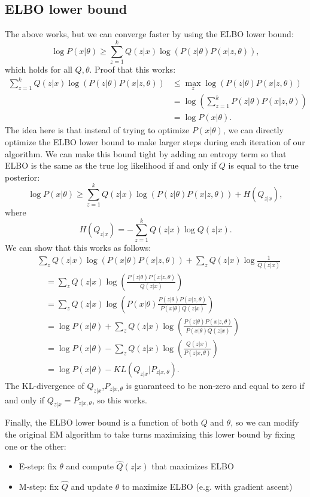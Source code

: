 \subsection{ELBO lower bound}

The above works, but we can converge faster by using the ELBO lower bound: 
\[\log P(x|\theta) \geq \sum_{z=1}^k Q(z|x)\log \left(P(z|\theta)P(x|z,\theta)\right),\]
which holds for all $Q,\theta$. Proof that this works: 
\begin{align*}
	\sum_{z=1}^k Q(z|x)\log \left(P(z|\theta)P(x|z,\theta)\right) &\leq \max_z \log \left(P(z|\theta)P(x|z,\theta)\right) \\
																																&= \log \left(\sum_{z=1}^k P(z|\theta) P(x|z,\theta)\right) \\
																																&= \log P(x|\theta). 
\end{align*}
The idea here is that instead of trying to optimize $P(x|\theta)$, we can directly optimize the ELBO lower bound to make larger steps during each iteration of our algorithm. We can make this bound tight by adding an entropy term so that ELBO is the same as the true log likelihood if and only if $Q$ is equal to the true posterior: 
\[\log P(x|\theta) \geq \sum_{z=1}^k Q(z|x)\log \left(P(z|\theta)P(x|z,\theta)\right) + H(Q_{z|x}), \]
where 
\[H(Q_{z|x}) = -\sum_{z=1}^kQ(z|x)\log Q(z|x).\]
We can show that this works as follows: 
\begin{align*}
	&\sum_z Q(z|x)\log \left(P(x|\theta)P(x|z,\theta)\right) + \sum_z Q(z|x) \log \frac{1}{Q(z|x)} \\
	&\quad = \sum_z Q(z|x)\log \left(\frac{P(z|\theta)P(x|z,\theta)}{Q(z|x)}\right) \\
	&\quad = \sum_z Q(z|x)\log \left(P(x|\theta) \frac{P(z|\theta)P(x|z,\theta)}{P(x|\theta)Q(z|x)}\right) \\
	&\quad = \log P(x|\theta) + \sum_z Q(z|x) \log \left(\frac{P(z|\theta)P(x|z,\theta)}{P(x|\theta)Q(z|x)}\right) \\
	&\quad = \log P(x|\theta) - \sum_z Q(z|x) \log \left(\frac{Q(z|x)}{P(z|x,\theta)}\right) \\
	&\quad = \log P(x|\theta) - KL(Q_{z|x} | P_{z|x,\theta}).
\end{align*}
The KL-divergence of $Q_{z|x}$,$P_{z|x,\theta}$ is guaranteed to be non-zero and equal to zero if and only if $Q_{z|x} = P_{z|x,\theta}$, so this works. 

Finally, the ELBO lower bound is a function of both $Q$ and $\theta$, so we can modify the original EM algorithm to take turns maximizing this lower bound by fixing one or the other:
\begin{itemize}
	\item E-step: fix $\theta$ and compute $\hat{Q}(z|x)$ that maximizes ELBO
	\item M-step: fix $\hat{Q}$ and update $\theta$ to maximize ELBO (e.g. with gradient ascent)
\end{itemize}
